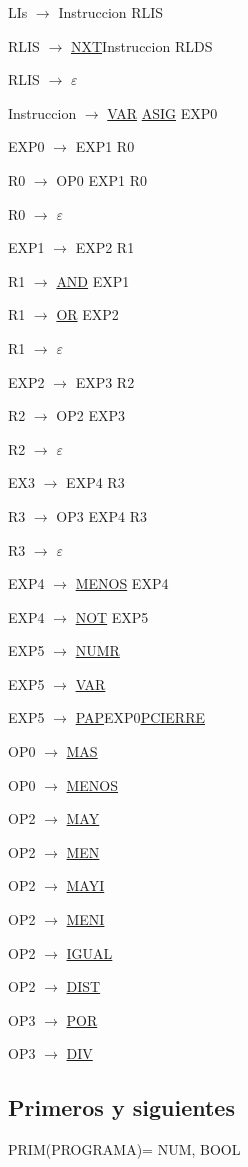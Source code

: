 \documentclass[11pt,oneside,onecolumn,openany,spanish]{book}
\begin{document}
LIs $\rightarrow$ Instruccion RLIS

RLIS $\rightarrow$ \underline{NXT}Instruccion RLDS

RLIS $\rightarrow$ $\varepsilon$

Instruccion $\rightarrow$ \underline{VAR} \underline{ASIG} EXP0
	
EXP0 $\rightarrow$ EXP1 R0

R0 $\rightarrow$ OP0 EXP1 R0

R0 $\rightarrow$ $\varepsilon$

EXP1 $\rightarrow$ EXP2 R1

R1 $\rightarrow$ \underline{AND} EXP1 

R1 $\rightarrow$ \underline{OR} EXP2  

R1 $\rightarrow$ $\varepsilon$

EXP2 $\rightarrow$ EXP3 R2 

R2 $\rightarrow$ OP2 EXP3 

R2 $\rightarrow$ $\varepsilon$ 

EX3 $\rightarrow$ EXP4 R3

R3 $\rightarrow$ OP3 EXP4 R3

R3 $\rightarrow$ $\varepsilon$

EXP4 $\rightarrow$ \underline{MENOS} EXP4

EXP4 $\rightarrow$ \underline{NOT} EXP5 

EXP5 $\rightarrow$ \underline{NUMR}

EXP5 $\rightarrow$ \underline{VAR}

EXP5 $\rightarrow$ \underline{PAP}EXP0\underline{PCIERRE} 

OP0 $\rightarrow$ \underline{MAS}

OP0 $\rightarrow$ \underline{MENOS} 

OP2 $\rightarrow$ \underline{MAY} 

OP2 $\rightarrow$ \underline{MEN} 

OP2 $\rightarrow$ \underline{MAYI} 

OP2 $\rightarrow$ \underline{MENI} 

OP2 $\rightarrow$ \underline{IGUAL} 

OP2 $\rightarrow$ \underline{DIST} 

OP3 $\rightarrow$ \underline{POR} 

OP3 $\rightarrow$ \underline{DIV} 

\subsection{Primeros y siguientes}
PRIM(PROGRAMA)= {NUM, BOOL}
\end{document}
